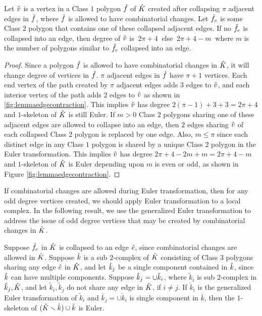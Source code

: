 \begin{lem}
  \label{lem:combinatorialdegree}
  Let $\hat{v}$ is a vertex in a Class $1$ polygon $\hat{f}$ of $\hat{K}$ created after collapsing $\pi$ adjacent edges in $\hat{f}$, where $\hat{f}$ is allowed to have combinatorial changes.
  Let $\hat{f}_e$ is some Class $2$ polygon that contains one of these collapsed adjacent edges.
  If no $\hat{f}_e$ is collapsed into an edge, then degree of $\hat{v}$ is $~2\pi + 4~$ else $~2\pi + 4 - m~$ where $m$ is the number of polygons similar to $\hat{f}_e$ collapsed into an edge. 
\end{lem}
\begin{proof}
  Since a polygon $\hat{f}$ is allowed to have combinatorial changes in $\hat{K}$, it will change degree of vertices in $\hat{f}$.
  $\pi$ adjacent edges in $\hat{f}$ have $\pi + 1$ vertices.
  Each end vertex of the path created by $\pi$ adjacent edges adds $3$ edges to $\hat{v}$, and each interior vertex of the path adds $2$ edges to $\hat{v}$ as shown in \cref{fig:lemmaedgecontraction}.
  This implies $\hat{v}$ has degree $2(\pi -1) + 3 + 3 = 2\pi + 4$ and $1$-skeleton of $\hat{K}$ is still Euler.
  If $m > 0$ Class $2$ polygons sharing one of these adjacent edges are allowed to collapse into an edge, then $2$ edges sharing $\hat{v}$ of each collapsed Class $2$ polygon is replaced by one edge.
  Also, $m \leq \pi$ since each distinct edge in any Class $1$ polygon is shared by a unique Class $2$ polygon in the Euler transformation.
  This implies $\hat{v}$ has degree $2\pi + 4 -2m + m = 2\pi + 4 - m$ and $1$-skeleton of $\hat{K}$ is Euler depending upon $m$ is even or odd, as shown in Figure \ref{fig:lemmaedgecontraction}.
\end{proof}


If combinatorial changes are allowed during Euler transformation, then for any odd degree vertices created, we should apply Euler transformation to a local complex.
In the following result, we use the generalized Euler transformation to address the issue of odd degree vertices that may be created by combinatorial changes in $\hat{K}$.


\begin{lem}
  \label{lem:localeulertransformation}
  Suppose $\hat{f}_e$ in $\hat{K}$ is collapsed to an edge $\hat{e}$, since combinatorial changes are allowed in $\hat{K}$.
  Suppose $\hat{k}$ is a sub $2$-complex of $\hat{K}$ consisting of Class $3$ polygons sharing any edge $\hat{e}$ in $\hat{K}$,
  and let $\hat{k}_j$ be a single component contained in $\hat{k}$, since $\hat{k}$ can have multiple components.
  Suppose $\hat{k}_j = \cup \tilde{k}_i$, where $\tilde{k}_i$ is sub $2$-complex in $\hat{k}_j, \hat{K}$, and let $\tilde{k}_i, \tilde {k}_j$ do not share any edge in $\hat{K}$, if $i \neq j$.
  If $\check{k}_i$ is the generalized Euler transformation of $\tilde{k}_i$ and $\bar{k}_j = \cup \check{k}_i$ is single component in $\bar{k}$, then the $1$-skeleton of $(\hat{K} \smallsetminus \hat{k}) \cup \bar{k}$ is Euler.  	
\end{lem}



